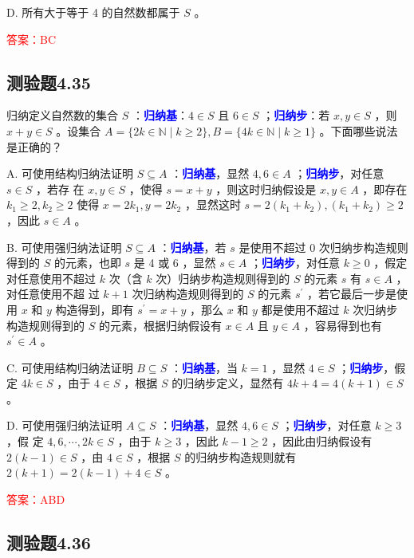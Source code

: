 \documentclass[UTF8, heading=true]{ctexart}
\begin{document}
D. 所有大于等于 4 的自然数都属于 $S$ 。

\textcolor{red}{答案：BC}

\subsection{测验题4.35}

归纳定义自然数的集合 $S$ ：\textcolor{blue}{\textbf{归纳基}}：$4 \in S$ 且 $6 \in S$ ；\textcolor{blue}{\textbf{归纳步}}：若 $x, y \in S$ ，则 $x+y \in S$ 。设集合 $A=\{2 k \in \mathbb{N} \mid k \geq 2\}, B=\{4 k \in \mathbb{N} \mid k \geq 1\}$ 。下面哪些说法是正确的？

A. 可使用结构归纳法证明 $S \subseteq A$ ：\textcolor{blue}{\textbf{归纳基}}，显然 $4,6 \in A$ ；\textcolor{blue}{\textbf{归纳步}}，对任意 $s \in S$ ，若存
在 $x, y \in S$ ，使得 $s=x+y$ ，则这时归纳假设是 $x, y \in A$ ，即存在 $k_1 \geq 2, k_2 \geq 2$ 使得 $x=2 k_1, y=2 k_2$ ，显然这时 $s=2\left(k_1+k_2\right),\left(k_1+k_2\right) \geq 2$ ，因此 $s \in A$ 。

B. 可使用强归纳法证明 $S \subseteq A$ ：\textcolor{blue}{\textbf{归纳基}}，若 $s$ 是使用不超过 0 次归纳步构造规则得到的 $S$ 的元素，也即 $s$ 是 4 或 6 ，显然 $s \in A$ ；\textcolor{blue}{\textbf{归纳步}}，对任意 $k \geq 0$ ，假定对任意使用不超过 $k$ 次（含 $k$ 次）归纳步构造规则得到的 $S$ 的元素 $s$ 有 $s \in A$ ，对任意使用不超
过 $k+1$ 次归纳构造规则得到的 $S$ 的元素 $s^{\prime}$ ，若它最后一步是使用 $x$ 和 $y$ 构造得到，即有 $s^{\prime}=x+y$ ，那么 $x$ 和 $y$ 都是使用不超过 $k$ 次归纳步构造规则得到的 $S$ 的元素，根据归纳假设有 $x \in A$ 且 $y \in A$ ，容易得到也有 $s^{\prime} \in A$ 。

C. 可使用结构归纳法证明 $B \subseteq S$ ：\textcolor{blue}{\textbf{归纳基}}，当 $k=1$ ，显然 $4 \in S$ ；\textcolor{blue}{\textbf{归纳步}}，假定 $4 k \in S$ ，由于 $4 \in S$ ，根据 $S$ 的归纳步定义，显然有 $4 k+4=4(k+1) \in S$ 。

D. 可使用强归纳法证明 $A \subseteq S$ ：\textcolor{blue}{\textbf{归纳基}}，显然 $4,6 \in S$ ；\textcolor{blue}{\textbf{归纳步}}，对任意 $k \geq 3$ ，假
定 $4,6, \cdots, 2 k \in S$ ，由于 $k \geq 3$ ，因此 $k-1 \geq 2$ ，因此由归纳假设有 $2(k-1) \in S$ ，由 $4 \in S$ ，根据 $S$ 的归纳步构造规则就有 $2(k+1)=2(k-1)+4 \in S$ 。

\textcolor{red}{答案：ABD}

\subsection{测验题4.36}
\end{document}
